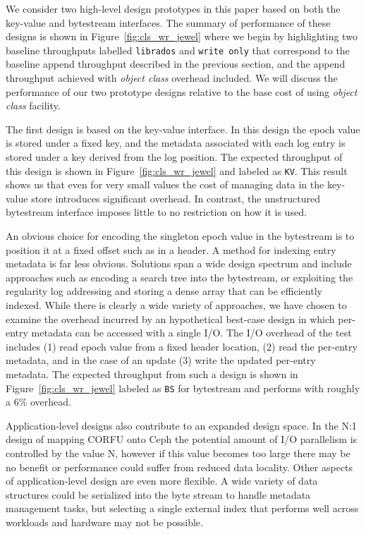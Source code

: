 \documentclass[10pt,twocolumn]{article}
\begin{document}
We consider two high-level design prototypes in this paper based on both the
key-value and bytestream interfaces. The summary of performance of these
designs is shown in Figure~\ref{fig:cls_wr_jewel} where we begin by
highlighting two baseline throughputs labelled \texttt{librados} and
\texttt{write only} that correspond to the baseline append throughput described
in the previous section, and the append throughput achieved with \emph{object
class} overhead included. We will discuss the performance of our two prototype
designs relative to the base cost of using \emph{object class} facility.

The first design is based on the key-value interface. In this design the epoch
value is stored under a fixed key, and the metadata associated with each log
entry is stored under a key derived from the log position. The expected
throughput of this design is shown in Figure~\ref{fig:cls_wr_jewel} and labeled
as \texttt{KV}. This result shows us that even for very small values the cost
of managing data in the key-value store introduces significant overhead. In
contrast, the unstructured bytestream interface imposes little to no
restriction on how it is used.

An obvious choice for encoding the singleton epoch value in the bytestream is
to position it at a fixed offset such as in a header. A method for indexing
entry metadata is far less obvious. Solutions span a wide design spectrum and
include approaches such as encoding a search tree into the bytestream, or
exploiting the regularity log addressing and storing a dense array that can be
efficiently indexed. While there is clearly a wide variety of approaches, we
have chosen to examine the overhead incurred by an hypothetical best-case
design in which per-entry metadata can be accessed with a single I/O. The I/O
overhead of the test includes (1) read epoch value from a fixed header
location, (2) read the per-entry metadata, and in the case of an update (3)
write the updated per-entry metadata. The expected throughput from such a
design is shown in Figure~\ref{fig:cls_wr_jewel} labeled as \texttt{BS} for
bytestream and performs with roughly a 6\% overhead.

Application-level designs also contribute to an expanded design space.  In the
N:1 design of mapping CORFU onto Ceph the potential amount of I/O parallelism
is controlled by the value N, however if this value becomes too large there may
be no benefit or performance could suffer from reduced data locality. Other
aspects of application-level design are even more flexible. A wide variety of
data structures could be serialized into the byte stream to handle metadata
management tasks, but selecting a single external index that performs well
across workloads and hardware may not be possible.
\end{document}
